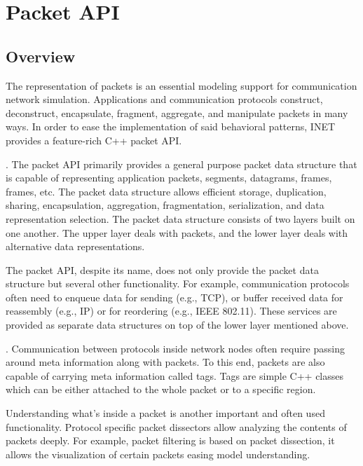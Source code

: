 \chapter{Packet API}
\label{cha:packet-api}

\section{Overview}

The representation of packets is an essential modeling support for
communication network simulation. Applications and communication protocols
construct, deconstruct, encapsulate, fragment, aggregate, and manipulate
packets in many ways. In order to ease the implementation of said
behavioral patterns, INET provides a feature-rich C++ packet API.

.
The packet API primarily provides a general purpose packet data structure
that is capable of representing application packets, 
segments,  datagrams,  frames,
 frames, etc. The packet data structure allows
efficient storage, duplication, sharing, encapsulation, aggregation,
fragmentation, serialization, and data representation selection. The packet
data structure consists of two layers built on one another. The upper layer
deals with packets, and the lower layer deals with alternative data
representations.

The packet API, despite its name, does not only provide the packet data
structure but several other functionality. For example, communication
protocols often need to enqueue data for sending (e.g., TCP), or buffer
received data for reassembly (e.g., IP) or for reordering (e.g., IEEE
802.11). These services are provided as separate data structures on top of
the lower layer mentioned above.

.
Communication between protocols inside network nodes often require passing
around meta information along with packets. To this end, packets are also
capable of carrying meta information called tags. Tags are simple C++
classes which can be either attached to the whole packet or to a specific
region.

Understanding what's inside a packet is another important and often used
functionality. Protocol specific packet dissectors allow analyzing the
contents of packets deeply. For example, packet filtering is based on
packet dissection, it allows the visualization of certain packets easing
model understanding.

